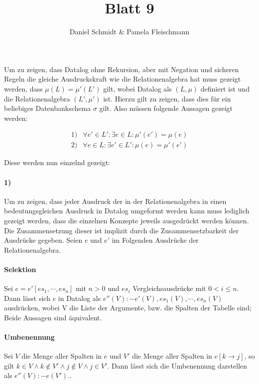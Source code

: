 \documentclass[12pt,a4paper]{amsart}
\begin{document}
\title{Blatt 9}

\author{Daniel Schmidt \& Pamela Fleischmann}

\maketitle

\begin{aufgabe1}
Um zu zeigen, dass Datalog ohne Rekursion, aber mit Negation und sicheren Regeln die gleiche Ausdruckskraft wie die Relationenalgebra hat muss gezeigt werden, dass $\mu(L) = \mu'(L')$ gilt, wobei Datalog als $(L, \mu)$ definiert ist und die Relationenalgebra $(L', \mu')$ ist.
Hierzu gilt zu zeigen, dass dies für ein beliebiges Datenbankschema $\sigma$ gilt.
Also müssen folgende Aussagen gezeigt werden:

\begin{align*}
1) &\forall e' \in L': \exists e \in L: \mu'(e') = \mu(e) \\
2) &\forall e \in L: \exists e' \in L': \mu(e) = \mu'(e')
\end{align*}

Diese werden nun einzelnd gezeigt:

\paragraph{1)}

Um zu zeigen, dass jeder Ausdruck der in der Relationenalgebra in einen bedeutungsgleichen Ausdruck in Datalog umgeformt werden kann muss lediglich gezeigt werden, dass die einzelnen Konzepte jeweils ausgedrückt werden können. Die Zusammensetzung dieser ist implizit durch die Zusammensetzbarkeit der Ausdrücke gegeben. Seien $e$ und $e'$ im Folgenden Ausdrücke der Relationenalgebra.

\paragraph{Selektion}
Sei $e = e'[es_1, \cdots, es_n]$ mit $n > 0$ und $es_i$ Vergleichsausdrücke mit $0 < i \le n$.
Dann lässt sich $e$ in Datalog als $e''(V) :- e'(V), es_1(V), \cdots, es_n(V)$ ausdrücken, wobei V die Liste der Argumente, bzw. die Spalten der Tabelle sind; Beide Aussagen sind äquivalent.

\paragraph{Umbenennung}
Sei $V$ die Menge aller Spalten in $e$ und $V'$ die Menge aller Spalten in $e[k \rightarrow j]$, so gilt $k \in V \wedge k \not \in V' \wedge j \not \in V \wedge j \in V'$. Dann lässt sich die Umbenennung darstellen als $e''(V) :- e(V').$.


\end{aufgabe1}
\end{document}
